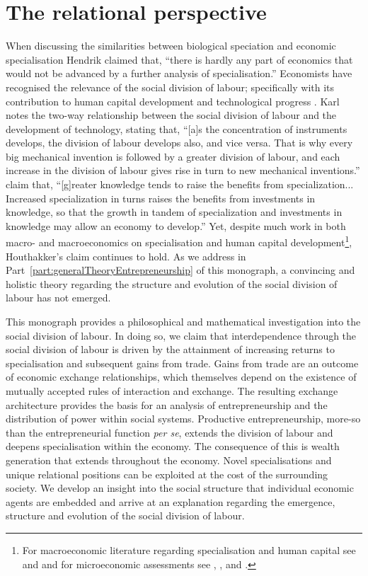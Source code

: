 \chapter{The relational perspective} 
\label{ch:relationalperspective}

When discussing the similarities between biological speciation and economic specialisation Hendrik \citet[p.~182]{Houthakker1956} claimed that, ``there is hardly any part of economics that would not be advanced by a further analysis of specialisation.'' Economists have recognised the relevance of the social division of labour; specifically with its contribution to human capital development and technological progress \citep{Liang2014}. Karl \citet[p.~139]{Marx1847} notes the two-way relationship between the social division of labour and the development of technology, stating that, ``[a]s the concentration of instruments develops, the division of labour develops also, and vice versa. That is why every big mechanical invention is followed by a greater division of labour, and each increase in the division of labour gives rise in turn to new mechanical inventions.'' \citet[p.~1157]{BeckerMurphy1992} claim that, ``[g]reater knowledge tends to raise the benefits from specialization... Increased specialization in turns raises the benefits from investments in knowledge, so that the growth in tandem of specialization and investments in knowledge may allow an economy to develop.'' Yet, despite much work in both macro- and macroeconomics on specialisation and human capital development\footnote{For macroeconomic literature regarding specialisation and human capital see \citet{Rosen1983} and \citet{Lucas1988} and for microeconomic assessments see \citet{YangBorland1991}, \citet{YangShi1992}, and \citet{ChengYang2004}.}, Houthakker's claim continues to hold. As we address in Part~\ref{part:generalTheoryEntrepreneurship} of this monograph, a convincing and holistic theory regarding the structure and evolution of the social division of labour has not emerged.

This monograph provides a philosophical and mathematical investigation into the social division of labour. In doing so, we claim that interdependence through the social division of labour is driven by the attainment of increasing returns to specialisation and subsequent gains from trade. Gains from trade are an outcome of economic exchange relationships, which themselves depend on the existence of mutually accepted rules of interaction and exchange. The resulting exchange architecture provides the basis for an analysis of entrepreneurship and the distribution of power within social systems. Productive entrepreneurship, more-so than the entrepreneurial function \emph{per se}, extends the division of labour and deepens specialisation within the economy. The consequence of this is wealth generation that extends throughout the economy. Novel specialisations and unique relational positions can be exploited at the cost of the surrounding society. We develop an insight into the social structure that individual economic agents are embedded and arrive at an explanation regarding the emergence, structure and evolution of the social division of labour. 

